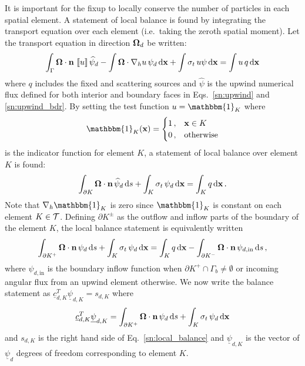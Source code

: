 \documentclass[../doc.tex]{subfiles}
\begin{document}
It is important for the fixup to locally conserve the number of particles in each spatial element. A statement of local balance is found by integrating the transport equation over each element (i.e.~taking the zeroth spatial moment). Let the transport equation in direction $\boldsymbol{\Omega}_d$ be written: 
	\begin{equation}
		\int_{\Gamma} \boldsymbol{\Omega}\cdot\boldsymbol{\mathrm{n}}\,\left\llbracket u \right\rrbracket \widehat{\psi}_d - \int \boldsymbol{\Omega}\cdot\nabla_h u\, \psi_d \mathop{}\!\mathrm{d} \boldsymbol{\mathrm{x}} + \int \sigma_t\, u \psi \mathop{}\!\mathrm{d} \boldsymbol{\mathrm{x}} = \int u\, q \mathop{}\!\mathrm{d} \boldsymbol{\mathrm{x}} 
	\end{equation}
where $q$ includes the fixed and scattering sources and $\widehat{\psi}$ is the upwind numerical flux defined for both interior and boundary faces in Eqs.~\ref{sn:upwind} and \ref{sn:upwind_bdr}. By setting the test function $u = \mathbbm{1}_K$ where 
	\begin{equation}
		\mathbbm{1}_{K}(\x) = \begin{cases} 
			1 \,, & \x \in K \\ 
			0 \,, & \text{otherwise} 
		\end{cases}
	\end{equation}
is the indicator function for element $K$, a statement of local balance over element $K$ is found: 
	\begin{equation}
		\int_{\partial K} \boldsymbol{\Omega}\cdot\boldsymbol{\mathrm{n}}\,\widehat{\psi}_d \mathop{}\!\mathrm{d} s + \int_K \sigma_t\, \psi_d \mathop{}\!\mathrm{d} \boldsymbol{\mathrm{x}} = \int_K q \mathop{}\!\mathrm{d} \boldsymbol{\mathrm{x}} \,. 
	\end{equation}
Note that $\nablah \mathbbm{1}_K$ is zero since $\mathbbm{1}_K$ is constant on each element $K \in \mathcal{T}$. Defining $\partial K^\pm$ as the outflow and inflow parts of the boundary of the element $K$, the local balance statement is equivalently written 
	\begin{equation} \label{sn:local_balance}
		\int_{\partial K^+} \boldsymbol{\Omega}\cdot\boldsymbol{\mathrm{n}}\, \psi_d \mathop{}\!\mathrm{d} s + \int_K \sigma_t\, \psi_d \mathop{}\!\mathrm{d} \boldsymbol{\mathrm{x}} = \int_K q \mathop{}\!\mathrm{d} \boldsymbol{\mathrm{x}} - \int_{\partial K^-} \boldsymbol{\Omega}\cdot\boldsymbol{\mathrm{n}}\,\psi_{d,\text{in}} \mathop{}\!\mathrm{d} s \,, 
	\end{equation}
where $\psi_{d,\text{in}}$ is the boundary inflow function when $\partial K^+ \cap \Gamma_b \neq \emptyset$ or incoming angular flux from an upwind element otherwise. We now write the balance statement as $\underline{c}_{d,K}^T \underline{\psi}_{d,K} = s_{d,K}$ where 
	\begin{equation}
	 	\underline{c}_{d,K}^T \underline{\psi}_{d,K} = \int_{\partial K^+} \boldsymbol{\Omega}\cdot\boldsymbol{\mathrm{n}}\, \psi_d \mathop{}\!\mathrm{d} s + \int_K \sigma_t\, \psi_d \mathop{}\!\mathrm{d} \boldsymbol{\mathrm{x}} 
	\end{equation} 
and $s_{d,K}$ is the right hand side of Eq.~\ref{sn:local_balance} and $\underline{\psi}_{d,K}$ is the vector of $\underline{\psi}_d$ degrees of freedom corresponding to element $K$. 
\end{document}
